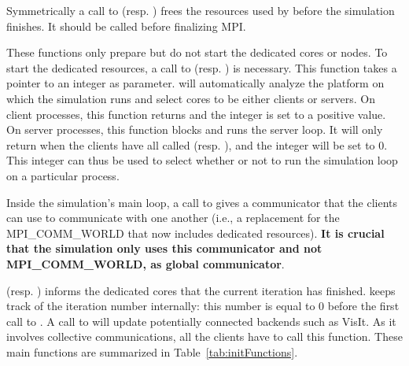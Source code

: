 Symmetrically a call
to  (resp. ) frees the resources used by
\Damaris{} before the simulation finishes. It should be called before finalizing MPI.

These functions only prepare \Damaris{} but do not start the dedicated cores or nodes.
To start the dedicated resources, a call to  (resp. )
is necessary. This function takes a pointer to an integer as parameter. \Damaris{} will automatically
analyze the platform on which the simulation runs and select cores to be either clients or servers.
On client processes, this function returns and the integer is set to a positive value. On server processes,
this function blocks and runs the server loop. It will only return when the clients have all called 
 (resp. ), and the integer will be set to 0.
This integer can thus be used to select whether or not to run the simulation loop on a particular process.

Inside the simulation's main loop, a call to 
 gives a
communicator that the clients can use to communicate with one another (i.e., a replacement for
the MPI\_COMM\_WORLD that now includes dedicated resources). \textbf{It is crucial that the
simulation only uses this communicator and not MPI\_COMM\_WORLD, as global communicator}. 

(resp. ) informs the dedicated cores that the current iteration 
has finished. \Damaris{} keeps track of the iteration number internally: 
this number is equal to 0 before the first call to .
A call to  will update potentially connected backends such as VisIt.
As it involves collective communications, all the clients have to call this function.
These main functions are summarized in Table~\ref{tab:initFunctions}.

